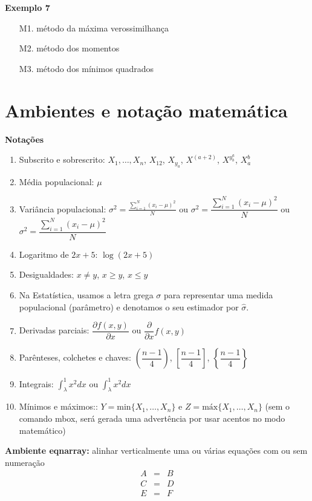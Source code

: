 \documentclass[12pt]{article}
\begin{document}
\noindent \textbf{Exemplo 7}
\begin{itemize}
    \item[M1.] método da máxima verossimilhança
    \item[M2.] método dos momentos
    \item[M3.] método dos mínimos quadrados
\end{itemize}

\newpage 

\section{Ambientes e notação matemática}

\noindent \textbf{Notações}
\begin{enumerate}
    \item Subscrito e sobrescrito: $X_1, \ldots, X_n$,  $X_{12}$, $X_{y_a}$, $X^{(a+2)}$, $X^{y^a_b}$, $X_a^b$
	\item Média populacional: $\mu$
	\item Variância populacional: $ \sigma^2 =  \frac{\sum_{i=1}^{N} (x_i-\mu)^2}{N} $ ou $ \sigma^2 =  \dfrac{\sum_{i=1}^{N} (x_i-\mu)^2}{N} $ ou $ \sigma^2 =  \dfrac{\displaystyle\sum_{i=1}^{N} (x_i-\mu)^2}{N}$
	\item Logaritmo de $2x+5$: $\log(2x+5)$
    \item Desigualdades: $x\neq y$, $ x\ge y$, $x \le y$
    \item Na Estatística, usamos a letra grega $\sigma$ para representar uma medida populacional (parâmetro) e denotamos o seu estimador por $\hat{\sigma}$.
    \item Derivadas parciais: $\dfrac{\partial{ f(x,y)}}{\partial{x}}$ ou $\dfrac{\partial{}}{\partial{x}}f(x,y)$
    \item Parênteses, colchetes e chaves: $\left( \dfrac{n-1}{4} \right)$, $\left[ \dfrac{n-1}{4} \right]$,  $\left\{ \dfrac{n-1}{4} \right\}$
    \item Integrais: $\int_{\lambda}^{1} x^2 dx$ ou  $\displaystyle\int_{\lambda}^{1} x^2 dx$
    \item Mínimos e máximos:: $Y=\mbox{min}\{X_1,\ldots,X_n\}$ e $Z=\mbox{máx}\{X_1,\ldots,X_n\}$ (sem o comando mbox, será gerada uma advertência por usar acentos no modo matemático)
\end{enumerate}    

\noindent \textbf{{Ambiente eqnarray:}} alinhar verticalmente uma ou várias equações com ou sem numeração
\begin{eqnarray*} %
A & = & B\\
C & = & D\\
E & = & F
\end{eqnarray*}
\end{document}
